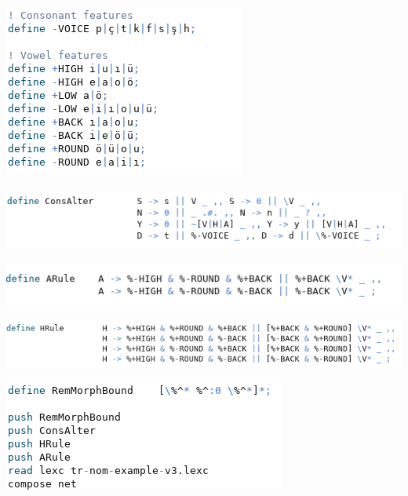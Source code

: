 \documentclass[ignorenonframetext,10pt,aspectratio=169]{beamer}
\begin{document}
\begin{frame}[t,plain]
\includegraphics[scale=0.4]{img/img2.png}
\end{frame}
\begin{frame}[t,plain]
\includegraphics[scale=0.4]{img/img3.png}
\end{frame}
\begin{frame}[t,plain]
\includegraphics[scale=0.4]{img/img4.png}
\end{frame}
\begin{frame}[t,plain]
\includegraphics[scale=0.4]{img/img5.png}
\end{frame}
\begin{frame}[t,plain]
\includegraphics[scale=0.4]{img/img6.png}
\end{frame}
\begin{frame}[t,plain]

\end{frame}

\begin{frame}[t,plain]

\end{frame}

\begin{frame}[t,plain]

\end{frame}

\begin{frame}[t,plain]

\end{frame}
\end{document}

